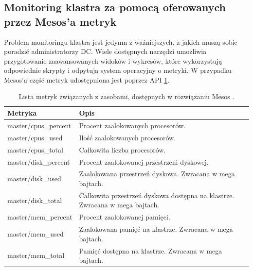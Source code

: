 \documentclass[10pt,a4paper,titlepage,twoside]{report}
\begin{document}
\subsection{Monitoring klastra za pomocą oferowanych przez Mesos'a metryk}
Problem monitoringu klastra jest jedynm z ważniejszych, z jakich muszą sobie poradzić administratorzy DC. Wiele dostępnych narzędzi umożliwia przygotowanie zaawansowanych widoków i wykresów, które wykorzystują odpowiednie skrypty i odpytują system operacyjny o metryki. W przypadku Mesos'a część metryk udostępniona jest poprzez API \ref{mesos_metrics}.

\begin{table}[!htbp]
\caption{Lista metryk związanych z zasobami, dostępnych w rozwiązaniu Mesos \cite{ad39}.}
\label{mesos_metrics}
\centering
\begin{tabular}{|p{4cm}|p{10cm}|}
  \hline
  \textbf{Metryka} & \textbf{Opis} \\
  \hline
  master/cpus\_percent & Procent zaalokowanych procesorów.\\
  \hline
  master/cpus\_used & Ilość zaalokowanych procesorów. \\
  \hline
  master/cpus\_total & Całkowita liczba procesorów. \\
  \hline
  master/disk\_percent & Procent zaalokowanej przestrzeni dyskowej. \\
  \hline
  master/disk\_used & Zaalokowana przestrzeń dyskowa. Zwracana w mega bajtach. \\
  \hline
  master/disk\_total & Całkowita przestrzeń dyskowa dostępna na klastrze. Zwracana w mega bajtach. \\
  \hline
  master/mem\_percent & Procent zaalokowanej pamięci. \\
  \hline
  master/mem\_used & Zaalokowana pamięć na klastrze. Zwracana w mega bajtach. \\
  \hline
  master/mem\_total & Pamięć dostępna na klastrze. Zwracana w mega bajtach. \\
  \hline
\end{tabular}
\end{table}
\end{document}
